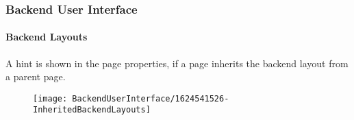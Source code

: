 %

\begin{frame}[fragile]
	\frametitle{Backend User Interface}
	\framesubtitle{Backend Layouts}

	A hint is shown in the page properties, if a page inherits the backend layout
	from a parent page.

	\begin{figure}
		\texttt{[image: BackendUserInterface/1624541526-InheritedBackendLayouts]}
	\end{figure}

\end{frame}

